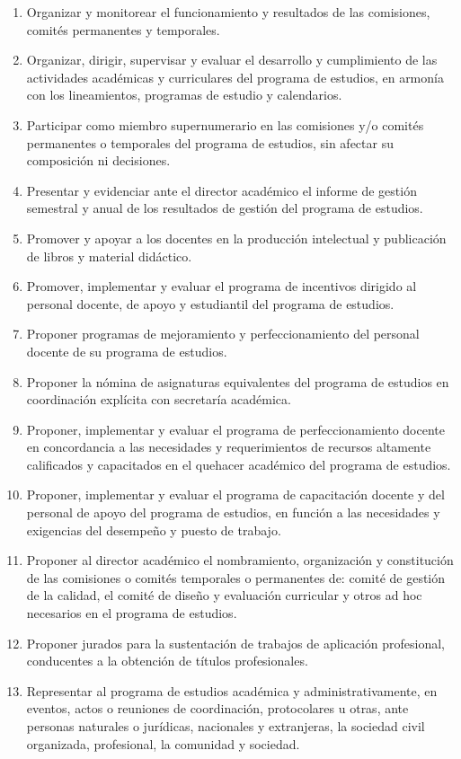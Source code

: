 \begin{enumerate}
\item Organizar y monitorear el funcionamiento y resultados de las comisiones, comités permanentes y temporales. 
\item Organizar, dirigir, supervisar y evaluar el desarrollo y cumplimiento de las actividades académicas y curriculares del programa de estudios, en armonía con los lineamientos, programas de estudio y calendarios. 
\item Participar como miembro supernumerario en las comisiones y/o comités permanentes o temporales del programa de estudios, sin afectar su composición ni decisiones. 
\item Presentar y evidenciar ante el director académico el informe de gestión semestral y anual de los resultados de gestión del programa de estudios. 
\item Promover y apoyar a los docentes en la producción intelectual y publicación de libros y material didáctico. 
\item Promover, implementar y evaluar el programa de incentivos dirigido al personal docente, de apoyo y estudiantil del programa de estudios. 
\item Proponer programas de mejoramiento y perfeccionamiento del personal docente de su programa de estudios. 
\item Proponer la nómina de asignaturas equivalentes del programa de estudios en coordinación explícita con secretaría académica. 
\item Proponer, implementar y evaluar el programa de perfeccionamiento docente en concordancia a las necesidades y requerimientos de recursos altamente calificados y capacitados en el quehacer académico del programa de estudios. 
\item Proponer, implementar y evaluar el programa de capacitación docente y del personal de apoyo del programa de estudios, en función a las necesidades y exigencias del desempeño y puesto de trabajo. 
\item Proponer al director académico el nombramiento, organización y constitución de las comisiones o comités temporales o permanentes de: comité de gestión de la calidad, el comité de diseño y evaluación curricular y otros ad hoc necesarios en el programa de estudios. 
\item Proponer jurados para la sustentación de trabajos de aplicación profesional, conducentes a la obtención de títulos profesionales. 
\item Representar al programa de estudios académica y administrativamente, en eventos, actos o reuniones de coordinación, protocolares u otras, ante personas naturales o jurídicas, nacionales y extranjeras, la sociedad civil organizada, profesional, la comunidad y sociedad. 

\end{enumerate}
